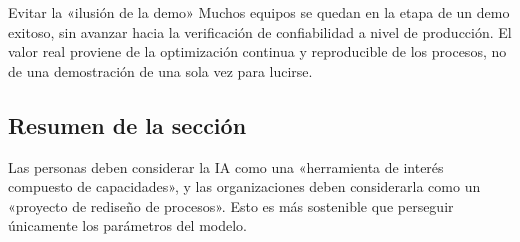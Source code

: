 \begin{warningbox}{Evitar la «ilusión de la demo»}
Muchos equipos se quedan en la etapa de un demo exitoso, sin avanzar hacia la verificación de confiabilidad a nivel de producción. El valor real proviene de la optimización continua y reproducible de los procesos, no de una demostración de una sola vez para lucirse.
\end{warningbox}

\subsection{Resumen de la sección}
Las personas deben considerar la IA como una «herramienta de interés compuesto de capacidades», y las organizaciones deben considerarla como un «proyecto de rediseño de procesos». Esto es más sostenible que perseguir únicamente los parámetros del modelo.

